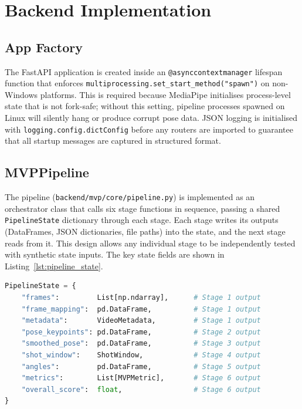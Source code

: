 \section{Backend Implementation}
\label{sec:backend_impl}

\subsection{App Factory}

The FastAPI application is created inside an \lstinline|@asynccontextmanager| lifespan function that enforces \lstinline|multiprocessing.set_start_method("spawn")| on non-Windows platforms. This is required because MediaPipe initialises process-level state that is not fork-safe; without this setting, pipeline processes spawned on Linux will silently hang or produce corrupt pose data. JSON logging is initialised with \lstinline|logging.config.dictConfig| before any routers are imported to guarantee that all startup messages are captured in structured format.

\subsection{MVPPipeline}

The pipeline (\lstinline|backend/mvp/core/pipeline.py|) is implemented as an orchestrator class that calls six stage functions in sequence, passing a shared \lstinline|PipelineState| dictionary through each stage. Each stage writes its outputs (DataFrames, JSON dictionaries, file paths) into the state, and the next stage reads from it. This design allows any individual stage to be independently tested with synthetic state inputs. The key state fields are shown in Listing~\ref{lst:pipeline_state}.

\noindent\begin{minipage}{\linewidth}
\begin{lstlisting}[language=Python,
                   caption={Schematic \texttt{PipelineState} dictionary passed between pipeline stages.},
                   label={lst:pipeline_state}]
PipelineState = {
    "frames":         List[np.ndarray],      # Stage 1 output
    "frame_mapping":  pd.DataFrame,          # Stage 1 output
    "metadata":       VideoMetadata,         # Stage 1 output
    "pose_keypoints": pd.DataFrame,          # Stage 2 output
    "smoothed_pose":  pd.DataFrame,          # Stage 3 output
    "shot_window":    ShotWindow,            # Stage 4 output
    "angles":         pd.DataFrame,          # Stage 5 output
    "metrics":        List[MVPMetric],       # Stage 6 output
    "overall_score":  float,                 # Stage 6 output
}
\end{lstlisting}
\end{minipage}

